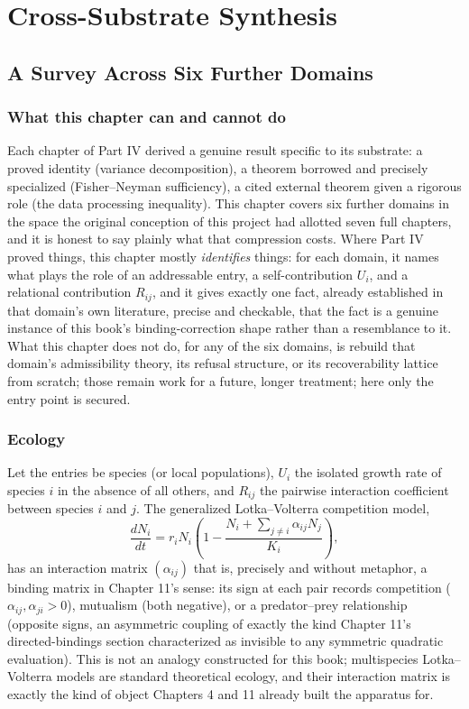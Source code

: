 \documentclass[11pt]{book}
\begin{document}
\part{Cross-Substrate Synthesis}

\chapter{A Survey Across Six Further Domains}

\section{What this chapter can and cannot do}

Each chapter of Part IV derived a genuine result specific to its substrate: a proved identity (variance decomposition), a theorem borrowed and precisely specialized (Fisher--Neyman sufficiency), a cited external theorem given a rigorous role (the data processing inequality). This chapter covers six further domains in the space the original conception of this project had allotted seven full chapters, and it is honest to say plainly what that compression costs. Where Part IV proved things, this chapter mostly \emph{identifies} things: for each domain, it names what plays the role of an addressable entry, a self-contribution $U_i$, and a relational contribution $R_{ij}$, and it gives exactly one fact, already established in that domain's own literature, precise and checkable, that the fact is a genuine instance of this book's binding-correction shape rather than a resemblance to it. What this chapter does not do, for any of the six domains, is rebuild that domain's admissibility theory, its refusal structure, or its recoverability lattice from scratch; those remain work for a future, longer treatment; here only the entry point is secured.

\section{Ecology}

Let the entries be species (or local populations), $U_i$ the isolated growth rate of species $i$ in the absence of all others, and $R_{ij}$ the pairwise interaction coefficient between species $i$ and $j$. The generalized Lotka--Volterra competition model,
\[
\frac{dN_i}{dt} = r_iN_i\left(1 - \frac{N_i + \sum_{j\ne i}\alpha_{ij}N_j}{K_i}\right),
\]
has an interaction matrix $(\alpha_{ij})$ that is, precisely and without metaphor, a binding matrix in Chapter 11's sense: its sign at each pair records competition ($\alpha_{ij},\alpha_{ji}>0$), mutualism (both negative), or a predator--prey relationship (opposite signs, an asymmetric coupling of exactly the kind Chapter 11's directed-bindings section characterized as invisible to any symmetric quadratic evaluation). This is not an analogy constructed for this book; multispecies Lotka--Volterra models are standard theoretical ecology, and their interaction matrix is exactly the kind of object Chapters 4 and 11 already built the apparatus for.
\end{document}
